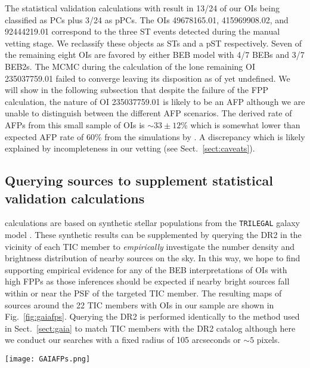 The statistical validation calculations with \vespa{} result in 13/24 of our
OIs being classified as PCs plus 3/24 as pPCs.
The OIs 49678165.01, 415969908.02, and 92444219.01 correspond to the three
ST events detected during the manual vetting stage. We reclassify these objects as STs and a pST
respectively. Seven of the remaining eight OIs are favored by either BEB
model with 4/7 BEBs and 3/7 BEB2s. The
MCMC during the \vespa{} calculation of the lone remaining OI 235037759.01 failed to converge
leaving its disposition as of yet undefined. We will
show in the following subsection that despite the failure of the FPP calculation, the nature of OI
235037759.01 is likely to be an AFP although we are unable to distinguish between the different
AFP scenarios. The derived rate of AFPs from this small sample of OIs is $\sim 33\pm 12$\% which
is somewhat lower than expected AFP rate of 60\% from the \tess{} simulations by \citep{sullivan15}.
A discrepancy which is likely explained by incompleteness in our vetting (see Sect.~\ref{sect:caveats}).


\subsection{Querying \gaia{} sources to supplement statistical validation calculations} \label{sect:gaiafps}
\vespa{} calculations are based on synthetic stellar populations from the
\texttt{TRILEGAL} galaxy model \citep{girardi05}. These synthetic results can be supplemented
by querying the \gaia{} DR2 in the vicinity of each TIC member to \emph{empirically}
investigate the number density and brightness
distribution of nearby sources on the sky. In this way, we hope to find supporting empirical evidence for
any of the BEB interpretations of OIs with high FPPs as those inferences should be expected if nearby bright
sources fall within or near the \tess{} PSF of the targeted TIC member. The resulting maps of \gaia{} sources around
the 22 TIC members with OIs in our sample are shown in Fig.~\ref{fig:gaiafps}. Querying the \gaia{} DR2 is
performed identically to the method used in Sect.~\ref{sect:gaia} to match TIC members with the \gaia{} DR2 catalog
although here we conduct our searches with a fixed radius of 105 arcseconds or $\sim 5$ \tess{} pixels. \\

\begin{figure*}
  \centering
  \texttt{[image: GAIAFPs.png]}
  \caption{Star maps containing sources from the \gaia{} DR2 in the vicinity of each TIC member identified
    as hosting an object of interest during the manual vetting stage. 
    Dispositions are annotated in the upper right of each panel (see Sect.~\ref{sect:vespa} for
    definitions). The fitted FWHM of each targeted TIC member's PSF is annotated in the upper left
    of its panel in arcsec as well as being depicted by the dashed black circle centered on the
    panel's origin. The colorbar is indicative of $G$-band magnitudes while marker sizes are proportional
    to the source flux in that band. For reference, the size of a single \tess{} detector pixel is shown
    in the lower right corner of the figure.}
  \label{fig:gaiafps}
\end{figure*}

